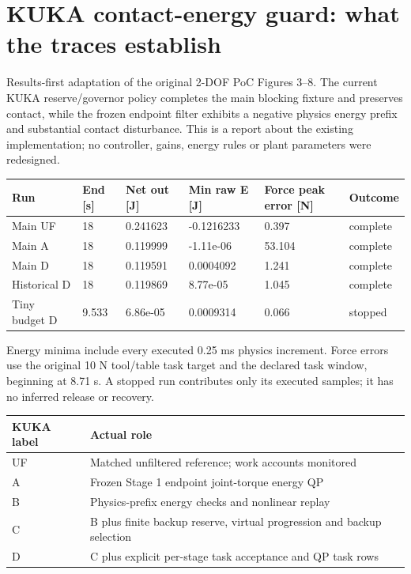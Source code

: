 \documentclass[10pt,letterpaper]{article}
\renewcommand{\arraystretch}{1.1}
\begin{document}
\section*{KUKA contact-energy guard: what the traces establish}
Results-first adaptation of the original 2-DOF PoC Figures 3--8. The current KUKA reserve/governor policy completes the main blocking fixture and preserves contact, while the frozen endpoint filter exhibits a negative physics energy prefix and substantial contact disturbance. This is a report about the existing implementation; no controller, gains, energy rules or plant parameters were redesigned.


\begingroup
\small
\setlength{\tabcolsep}{4pt}
\renewcommand{\arraystretch}{1.16}
\begin{tabular}{@{}llllll@{}}
\toprule
\textbf{Run} & \textbf{End [s]} & \textbf{Net out [J]} & \textbf{Min raw E [J]} & \textbf{Force peak error [N]} & \textbf{Outcome} \\
\midrule
Main UF & 18 & 0.241623 & -0.1216233 & 0.397 & complete \\
Main A & 18 & 0.119999 & -1.11e-06 & 53.104 & complete \\
Main D & 18 & 0.119591 & 0.0004092 & 1.241 & complete \\
Historical D & 18 & 0.119869 & 8.77e-05 & 1.045 & complete \\
Tiny budget D & 9.533 & 6.86e-05 & 0.0009314 & 0.066 & stopped \\
\bottomrule
\end{tabular}
\endgroup


Energy minima include every executed 0.25 ms physics increment. Force errors use the original 10 N tool/table task target and the declared task window, beginning at 8.71 s. A stopped run contributes only its executed samples; it has no inferred release or recovery.


\begingroup
\small
\setlength{\tabcolsep}{4pt}
\renewcommand{\arraystretch}{1.16}
\begin{tabular}{@{}p{}p{}@{}}
\toprule
\textbf{KUKA label} & \textbf{Actual role} \\
\midrule
UF & Matched unfiltered reference; work accounts monitored \\
A & Frozen Stage 1 endpoint joint-torque energy QP \\
B & Physics-prefix energy checks and nonlinear replay \\
C & B plus finite backup reserve, virtual progression and backup selection \\
D & C plus explicit per-stage task acceptance and QP task rows \\
\bottomrule
\end{tabular}
\endgroup
\end{document}
